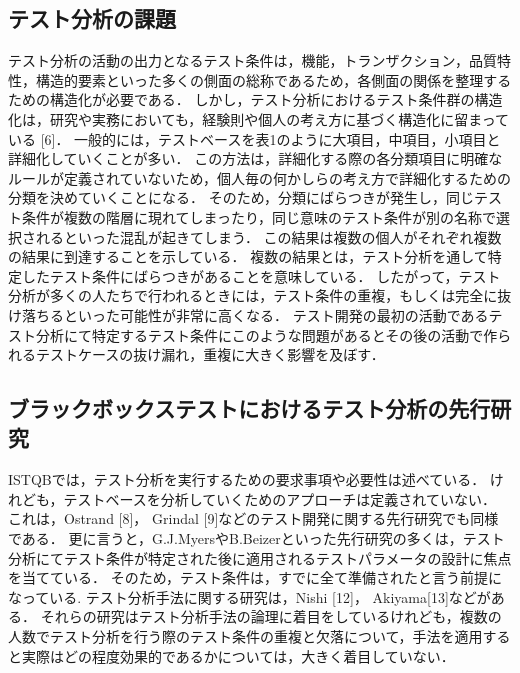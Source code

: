 \documentclass[a4paper,12pt]{jreport}
\begin{document}
\subsection{テスト分析の課題}
テスト分析の活動の出力となるテスト条件は，機能，トランザクション，品質特性，構造的要素といった多くの側面の総称であるため，各側面の関係を整理するための構造化が必要である．
しかし，テスト分析におけるテスト条件群の構造化は，研究や実務においても，経験則や個人の考え方に基づく構造化に留まっている [6]．
一般的には，テストベースを表1のように大項目，中項目，小項目と詳細化していくことが多い．
この方法は，詳細化する際の各分類項目に明確なルールが定義されていないため，個人毎の何かしらの考え方で詳細化するための分類を決めていくことになる．
そのため，分類にばらつきが発生し，同じテスト条件が複数の階層に現れてしまったり，同じ意味のテスト条件が別の名称で選択されるといった混乱が起きてしまう．
この結果は複数の個人がそれぞれ複数の結果に到達することを示している．
複数の結果とは，テスト分析を通して特定したテスト条件にばらつきがあることを意味している．
したがって，テスト分析が多くの人たちで行われるときには，テスト条件の重複，もしくは完全に抜け落ちるといった可能性が非常に高くなる．
テスト開発の最初の活動であるテスト分析にて特定するテスト条件にこのような問題があるとその後の活動で作られるテストケースの抜け漏れ，重複に大きく影響を及ぼす．

\subsection{ブラックボックステストにおけるテスト分析の先行研究}
ISTQBでは，テスト分析を実行するための要求事項や必要性は述べている．
けれども，テストベースを分析していくためのアプローチは定義されていない．
これは，Ostrand [8]， Grindal [9]などのテスト開発に関する先行研究でも同様である．
更に言うと，G.J.MyersやB.Beizerといった先行研究の多くは，テスト分析にてテスト条件が特定された後に適用されるテストパラメータの設計に焦点を当てている．
そのため，テスト条件は，すでに全て準備されたと言う前提になっている.
テスト分析手法に関する研究は，Nishi [12]， Akiyama[13]などがある．
それらの研究はテスト分析手法の論理に着目をしているけれども，複数の人数でテスト分析を行う際のテスト条件の重複と欠落について，手法を適用すると実際はどの程度効果的であるかについては，大きく着目していない．
\end{document}
